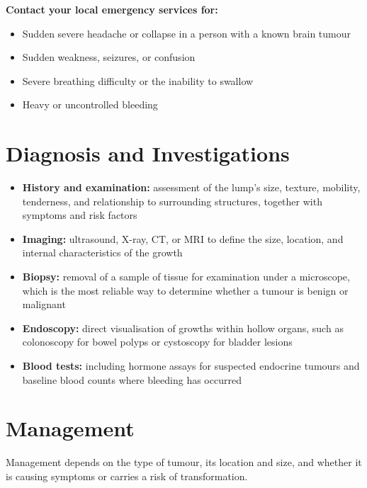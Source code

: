 \textbf{Contact your local emergency services for:}
\begin{itemize}
    \item Sudden severe headache or collapse in a person with a known brain tumour
    \item Sudden weakness, seizures, or confusion
    \item Severe breathing difficulty or the inability to swallow
    \item Heavy or uncontrolled bleeding
\end{itemize}

\section*{Diagnosis and Investigations}
\begin{itemize}
    \item \textbf{History and examination:} assessment of the lump's size, texture, mobility, tenderness, and relationship to surrounding structures, together with symptoms and risk factors
    \item \textbf{Imaging:} ultrasound, X-ray, CT, or MRI to define the size, location, and internal characteristics of the growth
    \item \textbf{Biopsy:} removal of a sample of tissue for examination under a microscope, which is the most reliable way to determine whether a tumour is benign or malignant
    \item \textbf{Endoscopy:} direct visualisation of growths within hollow organs, such as colonoscopy for bowel polyps or cystoscopy for bladder lesions
    \item \textbf{Blood tests:} including hormone assays for suspected endocrine tumours and baseline blood counts where bleeding has occurred
\end{itemize}

\section*{Management}
Management depends on the type of tumour, its location and size, and whether it is causing symptoms or carries a risk of transformation.

